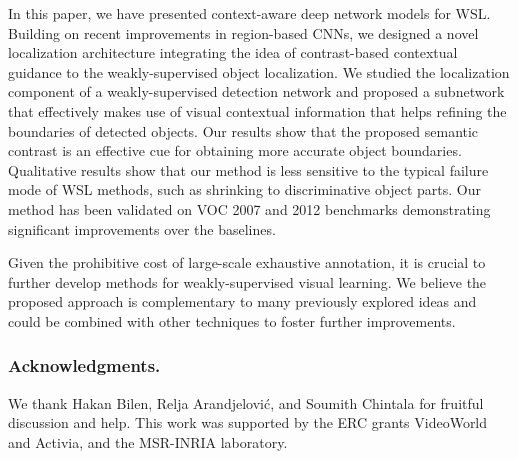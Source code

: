 
In this paper, we have presented context-aware deep network models for WSL. 
Building on recent improvements in region-based CNNs, 
we designed a novel localization architecture integrating the idea of contrast-based contextual guidance to the weakly-supervised object localization. We studied the localization component of a weakly-supervised 
detection network and proposed  a subnetwork that effectively makes use of visual contextual information 
that helps 
refining the boundaries of detected objects.
Our results show that the proposed semantic contrast is an effective cue for obtaining more accurate object 
boundaries. Qualitative results show that our method is less sensitive to the typical failure mode of WSL methods, such as 
shrinking to discriminative object parts. Our method has been validated on VOC 2007 and 2012 benchmarks demonstrating
significant improvements over the baselines.

Given the prohibitive cost of large-scale exhaustive annotation, it is crucial to further develop methods for weakly-supervised visual learning. We believe the proposed approach is complementary to many previously explored ideas and could be combined with other techniques to foster further improvements.







\subsubsection{Acknowledgments.}
We thank Hakan Bilen, Relja Arandjelovi\'{c}, and Soumith Chintala for fruitful discussion and help.
This work was supported by the ERC grants VideoWorld and Activia, and the MSR-INRIA laboratory.

